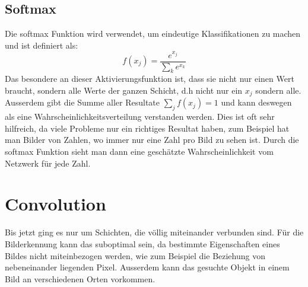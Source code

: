 \documentclass[12pt,a4paper]{report}
\begin{document}
\subsection{Softmax}
Die softmax Funktion wird verwendet, um eindeutige Klassifikationen zu machen und ist definiert als:
\[f(x_j) = \frac{e^{x_j}}{\sum_k{e^{x_k}}}\]
Das besondere an dieser Aktivierungsfunktion ist, dass sie nicht nur einen Wert braucht, sondern alle Werte der ganzen Schicht,
d.h nicht nur ein $x_j$ sondern alle.
Ausserdem gibt die Summe aller Resultate $\sum_j f(x_j) = 1$ und kann deswegen als eine Wahrscheinlichkeitsverteilung verstanden werden.
Dies ist oft sehr hilfreich, da viele Probleme nur ein richtiges Resultat haben, zum Beispiel hat man Bilder von Zahlen,
wo immer nur eine Zahl pro Bild zu sehen ist.
Durch die softmax Funktion sieht man dann eine geschätzte Wahrscheinlichkeit vom Netzwerk für jede Zahl.
\section{Convolution}
Bis jetzt ging es nur um Schichten, die völlig miteinander verbunden sind.
Für die Bilderkennung kann das suboptimal sein, da bestimmte Eigenschaften eines Bildes nicht miteinbezogen werden,
wie zum Beispiel die Beziehung von nebeneinander liegenden Pixel.
Ausserdem kann das gesuchte Objekt in einem Bild an verschiedenen Orten vorkommen.
\end{document}
